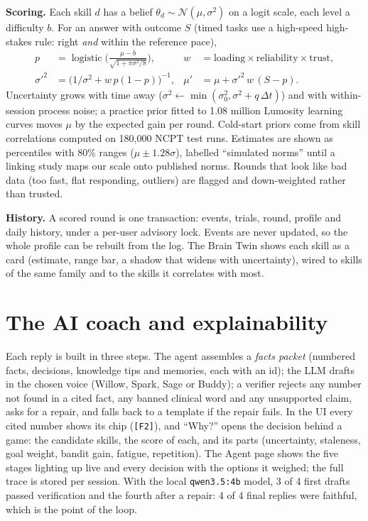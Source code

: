 \documentclass[10pt,a4paper]{article}
\begin{document}
\textbf{Scoring.} Each skill $d$ has a belief $\theta_d\sim\mathcal N(\mu,\sigma^2)$ on a logit scale,
each level a difficulty $b$. For an answer with outcome $S$ (timed tasks use a high-speed high-stakes
rule: right \emph{and} within the reference pace),
\begin{align*}
p &= \operatorname{logistic}\!\Big(\tfrac{\mu-b}{\sqrt{1+\pi\sigma^2/8}}\Big), &
w &= \text{loading}\times\text{reliability}\times\text{trust}, \\
\sigma'^2 &= \big(1/\sigma^2 + w\,p(1-p)\big)^{-1}, &
\mu' &= \mu + \sigma'^2\, w\,(S-p).
\end{align*}
Uncertainty grows with time away ($\sigma^2\leftarrow\min(\sigma_0^2,\sigma^2+q\,\Delta t)$) and with
within-session process noise; a practice prior fitted to 1.08 million Lumosity learning curves moves
$\mu$ by the expected gain per round. Cold-start priors come from skill correlations computed on
180{,}000 NCPT test runs. Estimates are shown as percentiles with 80\% ranges
($\mu\pm1.28\sigma$), labelled ``simulated norms'' until a linking study maps our scale onto
published norms. Rounds that look like bad data (too fast, flat responding, outliers) are flagged and
down-weighted rather than trusted.

\textbf{History.} A scored round is one transaction: events, trials, round, profile and daily
history, under a per-user advisory lock. Events are never updated, so the whole profile can be rebuilt
from the log. The Brain Twin shows each skill as a card (estimate, range bar, a shadow that widens
with uncertainty), wired to skills of the same family and to the skills it correlates with most.

\section{The AI coach and explainability}
Each reply is built in three steps. The agent assembles a \emph{facts packet} (numbered facts,
decisions, knowledge tips and memories, each with an id); the LLM drafts in the chosen voice (Willow,
Spark, Sage or Buddy); a verifier rejects any number not found in a cited fact, any banned clinical
word and any unsupported claim, asks for a repair, and falls back to a template if the repair fails.
In the UI every cited number shows its chip (\texttt{[F2]}), and ``Why?'' opens the decision behind a
game: the candidate skills, the score of each, and its parts (uncertainty, staleness, goal weight,
bandit gain, fatigue, repetition). The Agent page shows the five stages lighting up live and every
decision with the options it weighed; the full trace is stored per session. With the local
\texttt{qwen3.5:4b} model, 3 of 4 first drafts passed verification and the fourth after a repair:
4 of 4 final replies were faithful, which is the point of the loop.
\end{document}
